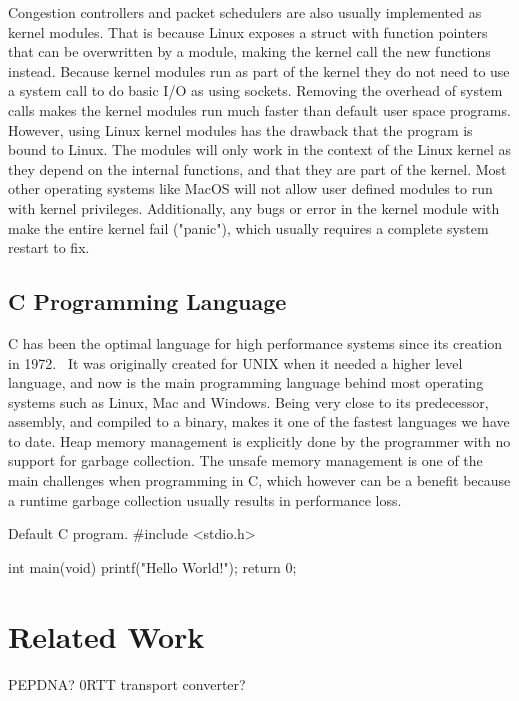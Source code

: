\documentclass[a4paper,english, 11pt]{report}
\begin{document}
Congestion controllers and packet schedulers are also usually implemented as kernel modules. That is because Linux exposes a struct with function pointers that can be overwritten by a module, making the kernel call the new functions instead. Because kernel modules run as part of the kernel they do not need to use a system call to do basic I/O as using sockets. Removing the overhead of system calls makes the kernel modules run much faster than default user space programs.\\

However, using Linux kernel modules has the drawback that the program is bound to Linux. The modules will only work in the context of the Linux kernel as they depend on the internal functions, and that they are part of the kernel. Most other operating systems like MacOS will not allow user defined modules to run with kernel privileges. Additionally, any bugs or error in the kernel module with make the entire kernel fail ("panic"), which usually requires a complete system restart to fix.

\subsection{C Programming Language}
C has been the optimal language for high performance systems since its creation in 1972.~\cite{c_programming_language} It was originally created for UNIX when it needed a higher level language, and now is the main programming language behind most operating systems such as Linux, Mac and Windows. Being very close to its predecessor, assembly, and compiled to a binary, makes it one of the fastest languages we have to date. Heap memory management is explicitly done by the programmer with no support for garbage collection. The unsafe memory management is one of the main challenges when programming in C, which however can be a benefit because a runtime garbage collection usually results in performance loss.

\begin{autonumlstlisting}[label=lst:hello_world]{Default C program.}
#include <stdio.h>

int main(void)
{
	printf("Hello World!");
	return 0;
}

\end{autonumlstlisting}

\section{Related Work}
PEPDNA? 0RTT transport converter?\cite{bandwidth_changes}
\end{document}

